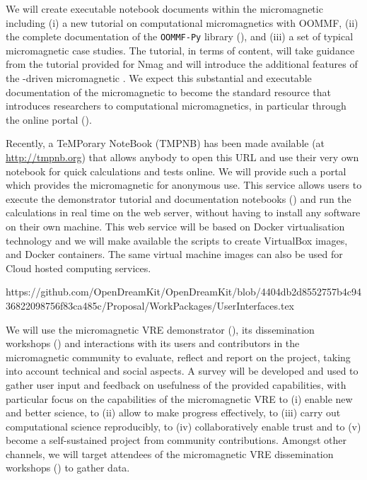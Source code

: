 \begin{Aim 1}
\begin{Aim 2}
\begin{itemize}
  We will create executable notebook documents
  within the micromagnetic \VRE
  including (i) a new tutorial on computational micromagnetics with
  OOMMF, (ii) the complete documentation of the \texttt{OOMMF-Py}
  library (),
  and (iii) a set of typical micromagnetic case studies. The tutorial,
  in terms of content, will take guidance from the tutorial provided
  for Nmag \cite{Nmag-tutorial-url} and will introduce the additional
  features of the \Jupyter-driven micromagnetic \VRE. We expect this
  substantial and executable documentation of the micromagnetic \VRE to
  become the standard resource that introduces researchers to
  computational micromagnetics, in particular through the online
portal ().
         
     Recently, a TeMPorary \Jupyter NoteBook (TMPNB) has been made
  available (at \href{http://tmpnb.org}{http://tmpnb.org}) that allows
  anybody to open this URL and use their very own \Jupyter notebook
  for quick calculations and tests online. We will provide such a
  portal which provides the
  micromagnetic \VRE for anonymous use. This service allows users to
  execute the demonstrator tutorial and documentation notebooks
  () and run the
  calculations in real time on the web server, without having to
  install any software on their own machine.  This web service will be
  based on Docker \cite{Docker} virtualisation technology and we will
  make available the scripts to create VirtualBox \cite{Virtualbox}
  images, and Docker containers. The same virtual machine images can
also be used for Cloud hosted computing services.

https://github.com/OpenDreamKit/OpenDreamKit/blob/4404db2d8552757b4c9436822098756f83ca485c/Proposal/WorkPackages/UserInterfaces.tex

We will use the micromagnetic VRE demonstrator
  (), its dissemination
  workshops ()
  and interactions with its users and contributors in the
  micromagnetic community to evaluate, reflect and report on the
  project, taking into account technical and social aspects. A survey
  will be developed and used to gather user input and feedback on
  usefulness of the provided capabilities, with particular focus on
  the capabilities of the micromagnetic VRE to (i) enable new and
  better science, to (ii) allow to make progress effectively, to (iii)
  carry out computational science reproducibly, to (iv)
  collaboratively enable trust and to (v) become a self-sustained
  project from community contributions. Amongst other channels, we
  will target attendees of the micromagnetic VRE dissemination
  workshops () to
  gather data.


\end{itemize}
\end{Aim 2}
\end{Aim 1}
